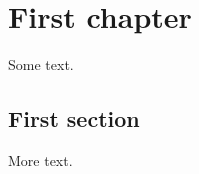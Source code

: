 

		\rhead{\today}

\lfoot{}			\cfoot{}				\rfoot{\thepage}


	
	
	
	\chapter{First chapter}
	Some text.
	
	\newpage
	
	\section{First section}
	More text.
	

